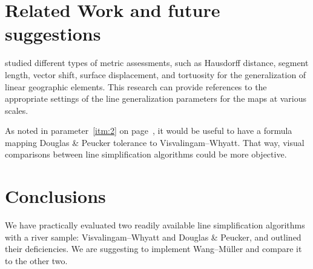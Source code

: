 \documentclass[a4paper]{article}
\newcommand{\DP}{Douglas \& Peucker}
\newcommand{\VW}{Visvalingam--Whyatt}
\newcommand{\WM}{Wang--M{\"u}ller}
\begin{document}
\section{Related Work and future suggestions}
\label{sec:related_work}

\cite{stanislawski2012automated} studied different types of metric assessments,
such as Hausdorff distance, segment length, vector shift, surface displacement,
and tortuosity for the generalization of linear geographic elements. This
research can provide references to the appropriate settings of the line
generalization parameters for the maps at various scales.

As noted in parameter~\ref{itm:2} on page~\pageref{itm:2}, it would be useful
to have a formula mapping {\DP} tolerance to {\VW}. That way, visual
comparisons between line simplification algorithms could be more objective.

\section{Conclusions}
\label{sec:conclusions}

We have practically evaluated two readily available line simplification
algorithms with a river sample: {\VW} and {\DP}, and outlined their
deficiencies. We are suggesting to implement {\WM} and compare it to the other
two.

\printbibliography
\end{document}
